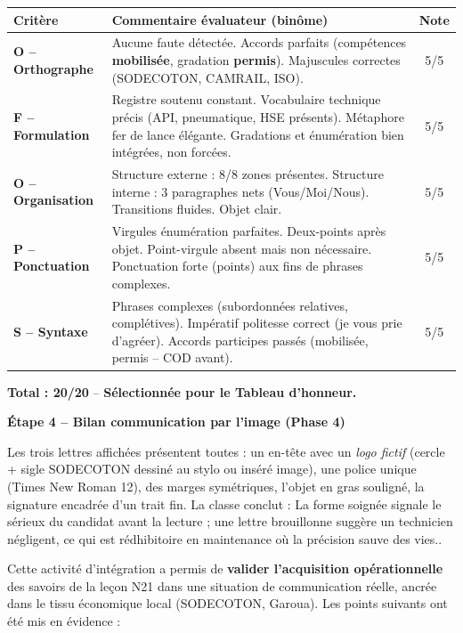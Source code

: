 \documentclass[11pt]{article}
\newcounter{popsec}
\newcounter{popsub}
\newcommand{\courssub}[1]{%
  \stepcounter{popsub}%
  \par\vspace{9pt}\noindent{\popxbold\fontsize{11.5}{13}\selectfont\color{popink}{\color{poporange}\thepopsec.\thepopsub}\hspace{6pt}#1}\par\nopagebreak\vspace{4pt}
}
\begin{document}
\begin{exoresolu}
\begin{center}
\begin{tabularx}{\linewidth}{|l|X|c|}\hline
\textbf{Critère} & \textbf{Commentaire évaluateur (binôme)} & \textbf{Note} \\ \hline
\textbf{O -- Orthographe} & Aucune faute détectée. Accords parfaits (compétences \textbf{mobilisé\textcolor{popgreen}{e}}, gradation \textbf{perm\textcolor{popgreen}{is}}). Majuscules correctes (SODECOTON, CAMRAIL, ISO). & 5/5 \\ \hline
\textbf{F -- Formulation} & Registre soutenu constant. Vocabulaire technique précis (API, pneumatique, HSE présents). Métaphore \og{}fer de lance\fg{} élégante. Gradations et énumération bien intégrées, non forcées. & 5/5 \\ \hline
\textbf{O -- Organisation} & Structure externe : 8/8 zones présentes. Structure interne : 3 paragraphes nets (Vous/Moi/Nous). Transitions fluides. Objet clair. & 5/5 \\ \hline
\textbf{P -- Ponctuation} & Virgules énumération parfaites. Deux-points après objet. Point-virgule absent mais non nécessaire. Ponctuation forte (points) aux fins de phrases complexes. & 5/5 \\ \hline
\textbf{S -- Syntaxe} & Phrases complexes (subordonnées relatives, complétives). Impératif politesse correct (\og{}je vous prie d'agréer\fg{}). Accords participes passés (mobilisée, permis -- COD avant). & 5/5 \\ \hline
\end{tabularx}
\end{center}
\par
\textbf{Total : 20/20} -- \textbf{Sélectionnée pour le Tableau d'honneur.}

\par
\textbf{Étape 4 -- Bilan communication par l'image (Phase 4)}
\par
Les trois lettres affichées présentent toutes : un en-tête avec un \emph{logo fictif} (cercle + sigle SODECOTON dessiné au stylo ou inséré image), une police unique (Times New Roman 12), des marges symétriques, l'objet en gras souligné, la signature encadrée d'un trait fin. La classe conclut : \og{}La forme soignée signale le sérieux du candidat avant la lecture ; une lettre brouillonne suggère un technicien négligent, ce qui est rédhibitoire en maintenance où la précision sauve des vies.\fg{}.

\end{exoresolu}

\courssub{Bilan de l'activité et remédiation}
\par
Cette activité d'intégration a permis de \textbf{valider l'acquisition opérationnelle} des savoirs de la leçon N21 dans une situation de communication réelle, ancrée dans le tissu économique local (SODECOTON, Garoua). Les points suivants ont été mis en évidence :
\end{document}
